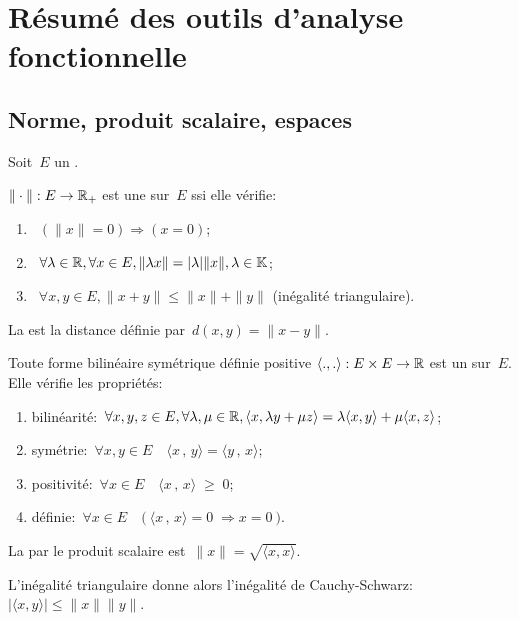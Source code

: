 \chapter*{Résumé des outils d'analyse fonctionnelle}

\section*{Norme, produit scalaire, espaces}

Soit~$E$ un .

\medskip
$\|\cdot\|: E\rightarrow \mathbb R_+$ est une  sur~$E$ ssi elle vérifie:
\begin{enumerate}
  \item~$(\|x\|=0) \Longrightarrow (x=0)$;
  \item~$\forall\lambda\in\mathbb R, \forall x\in E, \|\lambda x\|=|\lambda|\| x\|, \lambda\in\mathbb K$;
  \item~$\forall x,y\in E, \|x+y\|\le\|x\|+\|y\|$ (inégalité triangulaire).
\end{enumerate}

La  est la distance définie par~$d(x,y)=\|x-y\|$.

\medskip
Toute forme bilinéaire symétrique définie positive 
$\langle.,.\rangle: E\times E\rightarrow\mathbb R$ est un  sur~$E$.
Elle vérifie les propriétés:
\begin{enumerate}
  \item bilinéarité:~$\forall x,y,z\in E, \forall\lambda,\mu\in\mathbb R, \langle x,\lambda y+\mu z\rangle
=\lambda\langle x,y\rangle+\mu\langle x,z\rangle$;
  \item symétrie:~$\forall x,y \in E \quad \langle x\, , \, y \rangle = \langle y\, , \, x\rangle$;
  \item positivité:~$\forall x \in E \quad \langle x\, , \, x \rangle \; \ge \; 0$;
  \item définie:~$\forall x \in E \quad \big(\ \langle x\, , \, x \rangle = 0 \; \Rightarrow x = 0\ \big)$.
\end{enumerate}

La  par le produit scalaire est~$\|x\|=\sqrt{\langle x,x\rangle}$.

L'inégalité triangulaire donne alors l'inégalité de Cauchy-Schwarz:~$|\langle x,y\rangle|\le\|x\| \|y\|$.

